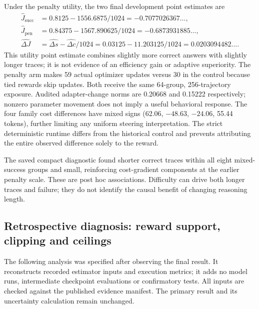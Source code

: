 \documentclass[11pt]{article}
\begin{document}
Under the penalty utility, the two final development point estimates are
\begin{align}
\widehat J_{\mathrm{succ}}&=0.8125-1556.6875/1024=-0.7077026367\ldots,\\
\widehat J_{\mathrm{pen}}&=0.84375-1567.890625/1024=-0.6873931885\ldots,\\
\widehat{\Delta J}&=\widehat{\Delta s}-\widehat{\Delta c}/1024
=0.03125-11.203125/1024=0.0203094482\ldots.
\end{align}
This utility point estimate combines slightly more correct answers with slightly longer traces; it is not evidence of an efficiency gain or adaptive superiority. The penalty arm makes 59 actual optimizer updates versus 30 in the control because tied rewards skip updates. Both receive the same 64-group, 256-trajectory exposure. Audited adapter-change norms are 0.20668 and 0.15222 respectively; nonzero parameter movement does not imply a useful behavioral response. The four family cost differences have mixed signs (62.06, $-48.63$, $-24.06$, 55.44 tokens), further limiting any uniform steering interpretation. The strict deterministic runtime differs from the historical control and prevents attributing the entire observed difference solely to the reward.

The saved compact diagnostic found shorter correct traces within all eight mixed-success groups and small, reinforcing cost-gradient components at the earlier penalty scale. These are post hoc associations. Difficulty can drive both longer traces and failure; they do not identify the causal benefit of changing reasoning length.

\subsection{Retrospective diagnosis: reward support, clipping and ceilings}
\label{sec:retrospective}

The following analysis was specified after observing the final result. It reconstructs recorded estimator inputs and execution metrics; it adds no model runs, intermediate checkpoint evaluations or confirmatory tests. All inputs are checked against the published evidence manifest. The primary result and its uncertainty calculation remain unchanged.
\end{document}

